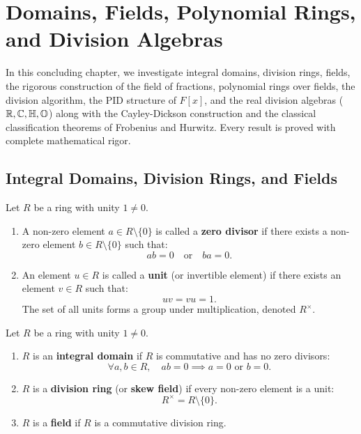 \chapter{Domains, Fields, Polynomial Rings, and Division Algebras}
\label{chap:unit5}

In this concluding chapter, we investigate integral domains, division rings, fields, the rigorous construction of the field of fractions, polynomial rings over fields, the division algorithm, the PID structure of $F[x]$, and the real division algebras ($\mathbb{R}, \mathbb{C}, \mathbb{H}, \mathbb{O}$) along with the Cayley-Dickson construction and the classical classification theorems of Frobenius and Hurwitz. Every result is proved with complete mathematical rigor.

\section{Integral Domains, Division Rings, and Fields}
\label{sec:domains_fields}

\begin{definition}
Let $R$ be a ring with unity $1 \ne 0$.
\begin{enumerate}[label=\textbf{(\arabic*)}, leftmargin=*, itemsep=4pt]
    \item A non-zero element $a \in R \setminus \{0\}$ is called a \textbf{zero divisor} if there exists a non-zero element $b \in R \setminus \{0\}$ such that:
    \begin{equation}
    ab = 0 \quad \text{or} \quad ba = 0.
    \end{equation}
    \item An element $u \in R$ is called a \textbf{unit} (or invertible element) if there exists an element $v \in R$ such that:
    \begin{equation}
    uv = vu = 1.
    \end{equation}
    The set of all units forms a group under multiplication, denoted $R^\times$.
\end{enumerate}
\end{definition}

\begin{definition}
Let $R$ be a ring with unity $1 \ne 0$.
\begin{enumerate}[label=\textbf{(\arabic*)}, leftmargin=*, itemsep=4pt]
    \item $R$ is an \textbf{integral domain} if $R$ is commutative and has no zero divisors:
    \begin{equation}
    \forall a, b \in R, \quad ab = 0 \implies a = 0 \text{ or } b = 0.
    \end{equation}
    \item $R$ is a \textbf{division ring} (or \textbf{skew field}) if every non-zero element is a unit:
    \begin{equation}
    R^\times = R \setminus \{0\}.
    \end{equation}
    \item $R$ is a \textbf{field} if $R$ is a commutative division ring.
\end{enumerate}
\end{definition}

